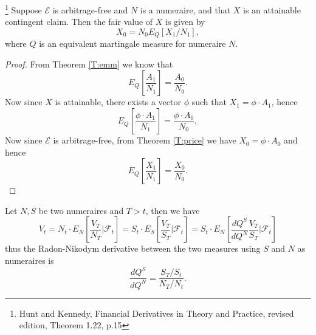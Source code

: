 \begin{theorem}
\footnote{Hunt and Kennedy, Financial Derivatives in Theory and Practice, 
    revised edition, Theorem 1.22, p.15}
Suppose $\mathcal{E}$ is arbitrage-free and $N$ is a numeraire, and that $X$ is
an attainable contingent claim. Then the fair value of $X$ is given by 
\[
  X_0 = N_0 E_Q[X_1 / N_1],
\]
where $Q$ is an equivalent martingale measure for numeraire $N$.
\end{theorem}  
\begin{proof}  %
From Theorem \ref{T:emm} we know that
\[
  E_Q\left[ \frac{A_1}{N_1}  \right] = \frac{A_0}{N_0}.
\]
Now since $X$ is attainable, there exists a vector $\phi$ such that 
$X_1=\phi\cdot A_1$, hence
\[
  E_Q\left[ \frac{\phi\cdot A_1}{N_1}  \right] = \frac{\phi\cdot A_0}{N_0},
\]
Now since $\mathcal{E}$ is arbitrage-free, from Theorem \ref{T:price} we have
$X_0 = \phi\cdot A_0$ and hence
\[
  E_Q\left[ \frac{X_1}{N_1}  \right] = \frac{X_0}{N_0}.
\]
\end{proof}    %

\begin{remark} \label{R:radon_num}
Let $N,S$ be two numeraires and $T>t$, then we have
\[
	V_t = N_t \cdot E_N\left[ \frac{V_T}{N_T} \bigg| \mathcal{F}_t \right]
    	= S_t \cdot E_S\left[ \frac{V_T}{S_T} \bigg| \mathcal{F}_t \right]
			= S_t \cdot E_N\left[ \frac{dQ^S}{dQ^N} \frac{V_T}{S_T} \bigg|
     			\mathcal{F}_t \right]
\]
thus the Radon-Nikodym derivative between the two measures using $S$ and $N$
as numeraires is
\[
	\frac{dQ^S}{dQ^N} = \frac{S_T/S_t}{N_T/N_t}.
\]
\end{remark}
